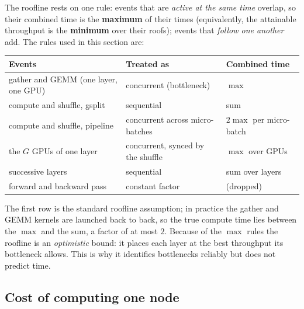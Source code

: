 The roofline rests on one rule: events that are \emph{active at the same time} overlap, so their
combined time is the \textbf{maximum} of their times (equivalently, the attainable throughput is
the \textbf{minimum} over their roofs); events that \emph{follow one another} add. The rules used
in this section are:
\begin{center}
\small
\begin{tabular}{l l l}
\toprule
Events & Treated as & Combined time \\
\midrule
gather and GEMM (one layer, one GPU) & concurrent (bottleneck) & $\max$ \\
compute and shuffle, gsplit & sequential & sum \\
compute and shuffle, pipeline & concurrent across micro-batches & $2\max$ per micro-batch \\
the $G$ GPUs of one layer & concurrent, synced by the shuffle & $\max$ over GPUs \\
successive layers & sequential & sum over layers \\
forward and backward pass & constant factor & (dropped) \\
\bottomrule
\end{tabular}
\end{center}
The first row is the standard roofline assumption; in practice the gather and GEMM kernels are
launched back to back, so the true compute time lies between the $\max$ and the sum, a factor of
at most $2$. Because of the $\max$ rules the roofline is an \emph{optimistic} bound: it places
each layer at the best throughput its bottleneck allows. This is why it identifies bottlenecks
reliably but does not predict time.

\subsection{Cost of computing one node}
\label{sec:cm-node}

